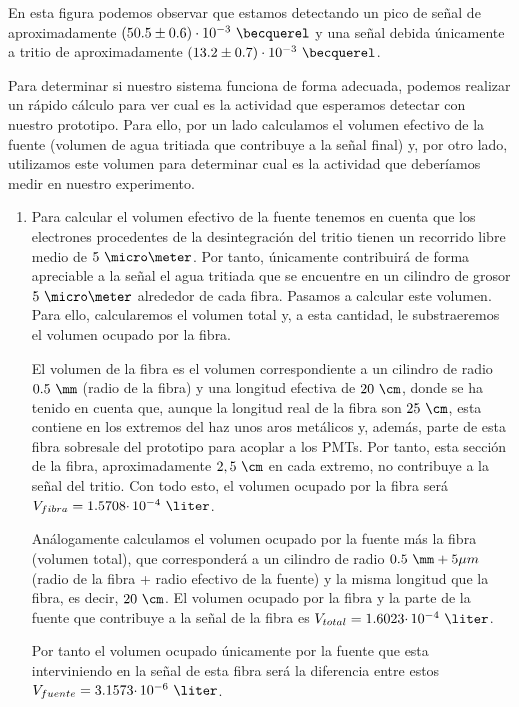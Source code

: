 En esta figura podemos observar que estamos detectando un pico de señal de aproximadamente $(50.5 \pm 0.6) \cdot 10^{-3}~\becquerel$ y una señal debida únicamente a tritio de aproximadamente $(13.2 \pm 0.7) \cdot 10^{-3}~\becquerel$. 

Para determinar si nuestro sistema funciona de forma adecuada, podemos realizar un rápido cálculo para ver cual es la actividad que esperamos detectar con nuestro prototipo. Para ello, por un lado calculamos el volumen efectivo de la fuente (volumen de agua tritiada que  contribuye a la señal final) y, por otro lado, utilizamos este volumen para determinar cual es la actividad que deberíamos medir en nuestro experimento.

\begin{enumerate}
 \item{} Para calcular el volumen efectivo de la fuente tenemos en cuenta que los electrones procedentes de la desintegración del tritio tienen un recorrido libre medio de $5~\micro\meter$. Por tanto, únicamente contribuirá de forma apreciable a la señal el agua tritiada que se encuentre en  un cilindro de grosor $5~\micro\meter$ alrededor de cada fibra. Pasamos a calcular este volumen. Para ello, calcularemos el volumen total y, a esta cantidad, le substraeremos el volumen ocupado por la fibra.

El volumen de la fibra es el volumen correspondiente a un cilindro de radio $0.5~\mm$ (radio de la fibra) y una longitud efectiva de $20~\cm$, donde se ha tenido en cuenta que, aunque la longitud real de la fibra son $25~\cm$, esta contiene en los extremos del haz unos aros metálicos y, además, parte de esta fibra sobresale del prototipo para acoplar a los PMTs. Por tanto, esta sección de la fibra, aproximadamente $2,5~\cm$ en cada extremo,  no contribuye a la señal del tritio. Con todo esto, el volumen ocupado por la fibra será $V_{fibra}=1.5708 \cdotp 10^{-4}~\liter$.

Análogamente calculamos el volumen ocupado por la fuente más la fibra (volumen total), que corresponderá a un cilindro de radio $0.5~\mm+5\mu m$ (radio de la fibra + radio efectivo de la fuente) y la misma longitud que la fibra, es decir, $20~\cm$. El volumen ocupado por la fibra y la parte de la fuente que contribuye a la señal de la fibra es $V_{total}=1.6023 \cdotp 10^{-4}~\liter$. 

Por tanto el volumen ocupado únicamente por la fuente que esta interviniendo en la señal de esta fibra será la diferencia entre estos $V_{fuente}=3.1573 \cdotp 10^{-6}~\liter$.
 

\end{enumerate}
